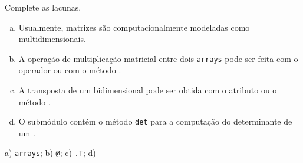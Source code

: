 \begin{exer}
  Complete as lacunas.
  \begin{enumerate}[a)]
    \item Usualmente, matrizes são computacionalmente modeladas como \underline{} multidimensionais.
    \item A operação de multiplicação matricial entre dois \texttt{arrays} pode ser feita com o operador \underline{} ou com o método {\PYTHONnumpyDOTmatmul}.
    \item A transposta de um {\PYTHONnumpyDOTarray} bidimensional pode ser obtida com o atributo \underline{} ou o método {\PYTHONnumpyDOTtranspose}.
    \item O submódulo \underline{\phantom{\PYTHONnumpyDOTlinalg}} contém o método \texttt{det} para a computação do determinante de um {\PYTHONnumpyDOTarray}.
  \end{enumerate}
\end{exer}
\begin{resp}
  a) \texttt{arrays}; b) \texttt{@}; c) \texttt{.T}; d) {\PYTHONnumpyDOTlinalg}
\end{resp}



